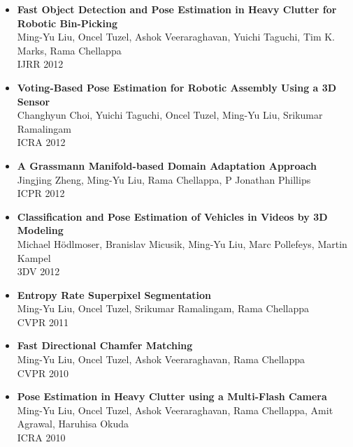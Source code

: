 \begin{itemize}
\item {\bf Fast Object Detection and Pose Estimation in Heavy Clutter for Robotic Bin-Picking}\\      
			Ming-Yu Liu, Oncel Tuzel, Ashok Veeraraghavan, Yuichi Taguchi, Tim K. Marks, Rama Chellappa\\ IJRR 2012\vspace{-2mm}
\item {\bf Voting-Based Pose Estimation for Robotic Assembly Using a 3D Sensor}\\
      Changhyun Choi, Yuichi Taguchi, Oncel Tuzel, Ming-Yu Liu, Srikumar Ramalingam\\ ICRA 2012\vspace{-2mm}
\item {\bf A Grassmann Manifold-based Domain Adaptation Approach}\\
			Jingjing Zheng, Ming-Yu Liu, Rama Chellappa, P Jonathan Phillips\\ ICPR 2012\vspace{-2mm}
\item {\bf Classification and Pose Estimation of Vehicles in Videos by 3D Modeling}\\%
      Michael Hödlmoser, Branislav Micusik, Ming-Yu Liu, Marc Pollefeys, Martin Kampel\\ 3DV 2012\vspace{-2mm}
\item {\bf Entropy Rate Superpixel Segmentation}\\                
			Ming-Yu Liu, Oncel Tuzel, Srikumar Ramalingam, Rama Chellappa\\ CVPR 2011\vspace{-2mm}
\item {\bf Fast Directional Chamfer Matching}\\                
			Ming-Yu Liu, Oncel Tuzel, Ashok Veeraraghavan, Rama Chellappa\\ CVPR 2010\vspace{-2mm}
\item {\bf Pose Estimation in Heavy Clutter using a Multi-Flash Camera}\\
      Ming-Yu Liu, Oncel Tuzel, Ashok Veeraraghavan, Rama Chellappa, Amit Agrawal, Haruhisa Okuda\\ ICRA 2010\vspace{-2mm}
\end{itemize}